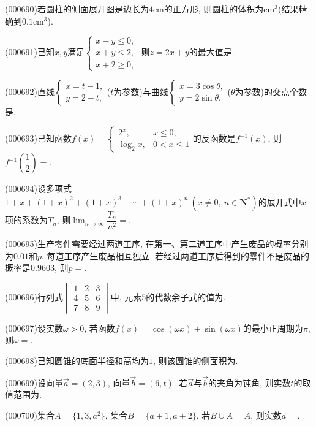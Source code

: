 \item (000690)若圆柱的侧面展开图是边长为$4\text{cm}$的正方形, 则圆柱的体积为$\text{cm}^3$(结果精确到$0.1\text{cm}^3$).
\item (000691)已知$x,y$满足$\begin{cases} x-y\le 0,\\ x+y\le 2, \\ x+2 \ge 0,\end{cases}$ 则$z=2x+y$的最大值是.
\item (000692)直线$\begin{cases} x=t-1, \\ y=2-t,\end{cases}$($t$为参数)与曲线$\begin{cases} x=3\cos\theta, \\ y=2\sin\theta,\end{cases}$($\theta$为参数)的交点个数是.
\item (000693)已知函数$f(x)=\begin{cases}2^x, & x\le 0, \\ \log_2 x, & 0<x\le 1\end{cases}$的反函数是$f^{-1}(x)$, 则$f^{-1}(\dfrac12)=$.
\item (000694)设多项式$1+x+(1+x)^2+(1+x)^3+\cdots+(1+x)^n\ (x\ne 0, \ n\in \mathbf{N}^*)$的展开式中$x$项的系数为$T_n$, 则$\displaystyle\lim_{n\to \infty}\dfrac{T_n}{n^2}=$.
\item (000695)生产零件需要经过两道工序, 在第一、第二道工序中产生废品的概率分别为$0.01$和$p$, 每道工序产生废品相互独立. 若经过两道工序后得到的零件不是废品的概率是$0.9603$, 则$p=$.
\item (000696)行列式$\begin{vmatrix} 1 & 2 & 3 \\ 4 & 5 & 6  \\ 7 & 8 & 9 \end{vmatrix}$中, 元素$5$的代数余子式的值为.
\item (000697)设实数$\omega>0$, 若函数$f(x)=\cos(\omega x)+\sin(\omega x)$的最小正周期为$\pi$, 则$\omega=$.
\item (000698)已知圆锥的底面半径和高均为$1$, 则该圆锥的侧面积为.
\item (000699)设向量$\overrightarrow{a}=(2,3)$, 向量$\overrightarrow{b}=(6,t)$. 若$\overrightarrow{a}$与$\overrightarrow{b}$的夹角为钝角, 则实数$t$的取值范围为.
\item (000700)集合$A=\{1,3,a^2\}$, 集合$B=\{a+1,a+2\}$. 若$B\cup A=A$, 则实数$a=$.
